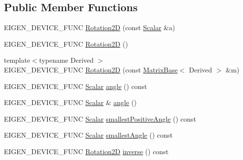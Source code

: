 \subsection*{Public Member Functions}
\begin{DoxyCompactItemize}
\item 
E\+I\+G\+E\+N\+\_\+\+D\+E\+V\+I\+C\+E\+\_\+\+F\+U\+NC \mbox{\hyperlink{class_eigen_1_1_rotation2_d_a581ea9ac3741f81c9c9416ed77246cc2}{Rotation2D}} (const \mbox{\hyperlink{class_eigen_1_1_rotation2_d_ac20c665ece0f197a712a2a39ae72e4e4}{Scalar}} \&a)
\item 
E\+I\+G\+E\+N\+\_\+\+D\+E\+V\+I\+C\+E\+\_\+\+F\+U\+NC \mbox{\hyperlink{class_eigen_1_1_rotation2_d_adcd50e17d84f71f584335e8ff3f2d994}{Rotation2D}} ()
\item 
{\footnotesize template$<$typename Derived $>$ }\\E\+I\+G\+E\+N\+\_\+\+D\+E\+V\+I\+C\+E\+\_\+\+F\+U\+NC \mbox{\hyperlink{class_eigen_1_1_rotation2_d_a6f6f81f37238abfb3b258c0d93f53314}{Rotation2D}} (const \mbox{\hyperlink{class_eigen_1_1_matrix_base}{Matrix\+Base}}$<$ Derived $>$ \&m)
\item 
E\+I\+G\+E\+N\+\_\+\+D\+E\+V\+I\+C\+E\+\_\+\+F\+U\+NC \mbox{\hyperlink{class_eigen_1_1_rotation2_d_ac20c665ece0f197a712a2a39ae72e4e4}{Scalar}} \mbox{\hyperlink{class_eigen_1_1_rotation2_d_af34ab8da6bfe010ca66c8acafa239a6e}{angle}} () const
\item 
E\+I\+G\+E\+N\+\_\+\+D\+E\+V\+I\+C\+E\+\_\+\+F\+U\+NC \mbox{\hyperlink{class_eigen_1_1_rotation2_d_ac20c665ece0f197a712a2a39ae72e4e4}{Scalar}} \& \mbox{\hyperlink{class_eigen_1_1_rotation2_d_ac91b3210ee741ca2cf1b2e4acc100672}{angle}} ()
\item 
E\+I\+G\+E\+N\+\_\+\+D\+E\+V\+I\+C\+E\+\_\+\+F\+U\+NC \mbox{\hyperlink{class_eigen_1_1_rotation2_d_ac20c665ece0f197a712a2a39ae72e4e4}{Scalar}} \mbox{\hyperlink{class_eigen_1_1_rotation2_d_ad3445ec4d8b7931f16096c1894e7986f}{smallest\+Positive\+Angle}} () const
\item 
E\+I\+G\+E\+N\+\_\+\+D\+E\+V\+I\+C\+E\+\_\+\+F\+U\+NC \mbox{\hyperlink{class_eigen_1_1_rotation2_d_ac20c665ece0f197a712a2a39ae72e4e4}{Scalar}} \mbox{\hyperlink{class_eigen_1_1_rotation2_d_a38e64a85197dc268a3e7832e75e469c7}{smallest\+Angle}} () const
\item 
E\+I\+G\+E\+N\+\_\+\+D\+E\+V\+I\+C\+E\+\_\+\+F\+U\+NC \mbox{\hyperlink{class_eigen_1_1_rotation2_d}{Rotation2D}} \mbox{\hyperlink{class_eigen_1_1_rotation2_d_a31e2adeabbde2a5210237f903fc40600}{inverse}} () const
\item 

\end{DoxyCompactItemize}
